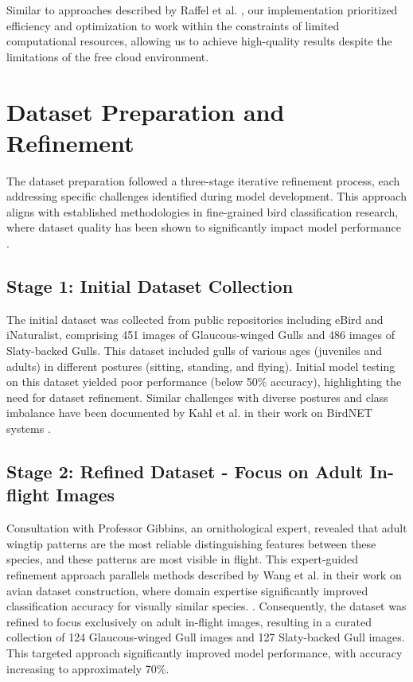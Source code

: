 \documentclass[a4paper,12pt]{article}
\begin{document}
Similar to approaches described by Raffel et al. \citet{raffel2023}, our implementation prioritized efficiency and optimization to work within the constraints of limited computational resources, allowing us to achieve high-quality results despite the limitations of the free cloud environment.

\section{Dataset Preparation and Refinement}

The dataset preparation followed a three-stage iterative refinement process, each addressing specific challenges identified during model development. This approach aligns with established methodologies in fine-grained bird classification research, where dataset quality has been shown to significantly impact model performance \citet{ghani2024}.

\subsection{Stage 1: Initial Dataset Collection}

The initial dataset was collected from public repositories including eBird and iNaturalist, comprising 451 images of Glaucous-winged Gulls and 486 images of Slaty-backed Gulls. This dataset included gulls of various ages (juveniles and adults) in different postures (sitting, standing, and flying). Initial model testing on this dataset yielded poor performance (below 50\% accuracy), highlighting the need for dataset refinement. Similar challenges with diverse postures and class imbalance have been documented by Kahl et al. in their work on BirdNET systems \citet{kahl2021}.




\subsection{Stage 2: Refined Dataset - Focus on Adult In-flight Images}

Consultation with Professor Gibbins, an ornithological expert, revealed that adult wingtip patterns are the most reliable distinguishing features between these species, and these patterns are most visible in flight. This expert-guided refinement approach parallels methods described by Wang et al. in their work on avian dataset construction, where domain expertise significantly improved classification accuracy for visually similar species. \citet{wang2022}. Consequently, the dataset was refined to focus exclusively on adult in-flight images, resulting in a curated collection of 124 Glaucous-winged Gull images and 127 Slaty-backed Gull images. This targeted approach significantly improved model performance, with accuracy increasing to approximately 70\%.
\end{document}
